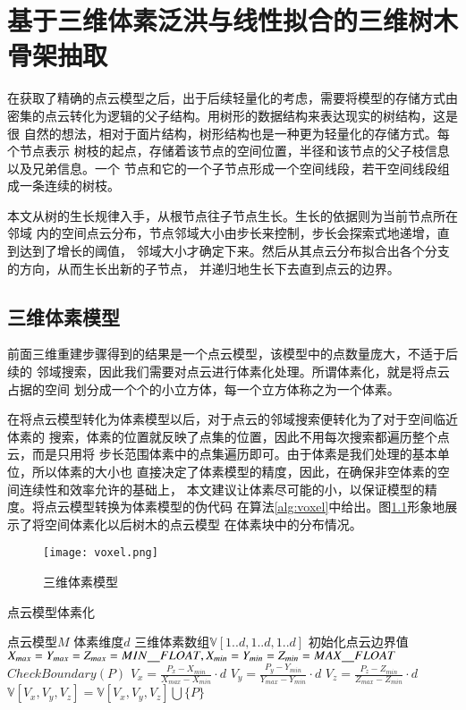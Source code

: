 \chapter{基于三维体素泛洪与线性拟合的三维树木骨架抽取}
\label{sec:sklextract}
在获取了精确的点云模型之后，出于后续轻量化的考虑，需要将模型的存储方式由
密集的点云转化为逻辑的父子结构。用树形的数据结构来表达现实的树结构，这是很
自然的想法，相对于面片结构，树形结构也是一种更为轻量化的存储方式。每个节点表示
树枝的起点，存储着该节点的空间位置，半径和该节点的父子枝信息以及兄弟信息。一个
节点和它的一个子节点形成一个空间线段，若干空间线段组成一条连续的树枝。

本文从树的生长规律入手，从根节点往子节点生长。生长的依据则为当前节点所在邻域
内的空间点云分布，节点邻域大小由步长来控制，步长会探索式地递增，直到达到了增长的阈值，
邻域大小才确定下来。然后从其点云分布拟合出各个分支的方向，从而生长出新的子节点，
并递归地生长下去直到点云的边界。

\section{三维体素模型}
前面三维重建步骤得到的结果是一个点云模型，该模型中的点数量庞大，不适于后续的
邻域搜索，因此我们需要对点云进行体素化处理。所谓体素化，就是将点云占据的空间
划分成一个个的小立方体，每一个立方体称之为一个体素。

在将点云模型转化为体素模型以后，对于点云的邻域搜索便转化为了对于空间临近体素的
搜索，体素的位置就反映了点集的位置，因此不用每次搜索都遍历整个点云，而是只用将
步长范围体素中的点集遍历即可。由于体素是我们处理的基本单位，所以体素的大小也
直接决定了体素模型的精度，因此，在确保非空体素的空间连续性和效率允许的基础上，
本文建议让体素尽可能的小，以保证模型的精度。将点云模型转换为体素模型的伪代码
在算法\ref{alg:voxel}中给出。图\ref{fig:voxel}形象地展示了将空间体素化以后树木的点云模型
在体素块中的分布情况。

\begin{figure}[H]
	\centering
	\texttt{[image: voxel.png]}
	\caption{三维体素模型}
	\label{fig:voxel}
\end{figure}

\begin{algorithm}[H]
	\caption{点云模型体素化}
	\label{alg:voxel}
	\begin{algorithmic}[1] 
	\Require 点云模型$M$
	\Require 体素维度$d$
	\Ensure 三维体素数组$\mathbb{V}[1..d,1..d,1..d]$
	\State 初始化点云边界值$X_{max}=Y_{max}=Z_{max}=MIN\uline\quad FLOAT,X_{min}=Y_{min}=Z_{min}=MAX\uline\quad FLOAT$
		\State $CheckBoundary(P)$
	\EndFor
{}
\State $V_x = \frac{P_x-X_{min}}{X_{max}-X_{min}}\cdot d$
\State $V_y = \frac{P_y-Y_{min}}{Y_{max}-Y_{min}}\cdot d$
\State $V_z = \frac{P_z-Z_{min}}{Z_{max}-Z_{min}}\cdot d$
\State $\mathbb{V}[V_x, V_y, V_z] = \mathbb{V}[V_x, V_y, V_z] \bigcup \{P\} $
	\EndFor
\end{algorithmic}
\end{algorithm}

